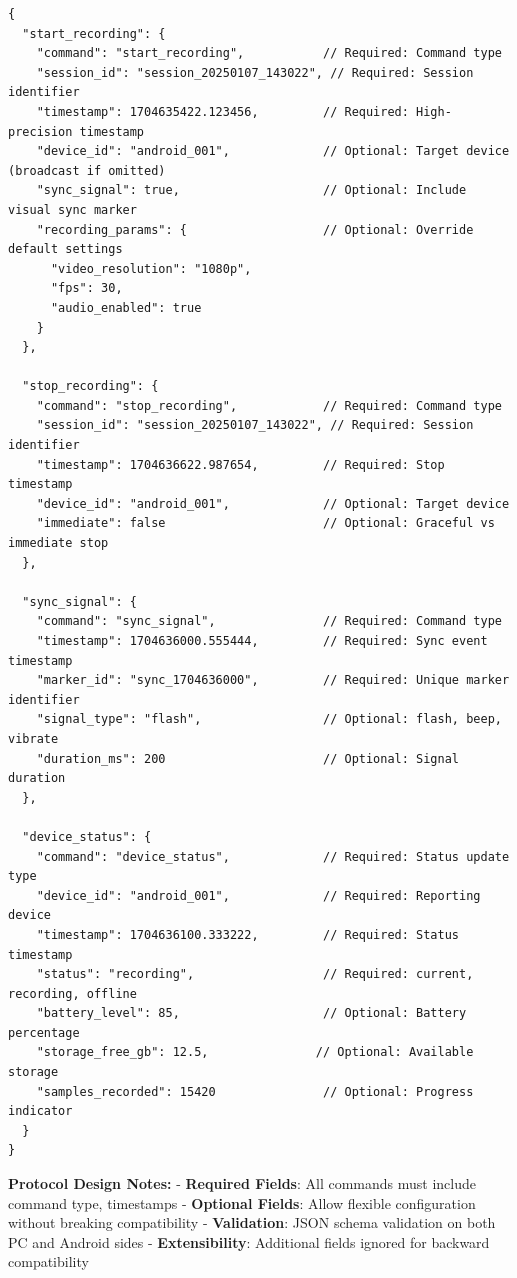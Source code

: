 \documentclass[12pt,a4paper]{article}
\begin{document}
\begin{lstlisting}
{
  "start_recording": {
    "command": "start_recording",           // Required: Command type
    "session_id": "session_20250107_143022", // Required: Session identifier  
    "timestamp": 1704635422.123456,         // Required: High-precision timestamp
    "device_id": "android_001",             // Optional: Target device (broadcast if omitted)
    "sync_signal": true,                    // Optional: Include visual sync marker
    "recording_params": {                   // Optional: Override default settings
      "video_resolution": "1080p",
      "fps": 30,
      "audio_enabled": true
    }
  },
  
  "stop_recording": {
    "command": "stop_recording",            // Required: Command type
    "session_id": "session_20250107_143022", // Required: Session identifier
    "timestamp": 1704636622.987654,         // Required: Stop timestamp
    "device_id": "android_001",             // Optional: Target device
    "immediate": false                      // Optional: Graceful vs immediate stop
  },
  
  "sync_signal": {
    "command": "sync_signal",               // Required: Command type
    "timestamp": 1704636000.555444,         // Required: Sync event timestamp
    "marker_id": "sync_1704636000",         // Required: Unique marker identifier
    "signal_type": "flash",                 // Optional: flash, beep, vibrate
    "duration_ms": 200                      // Optional: Signal duration
  },
  
  "device_status": {
    "command": "device_status",             // Required: Status update type
    "device_id": "android_001",             // Required: Reporting device
    "timestamp": 1704636100.333222,         // Required: Status timestamp
    "status": "recording",                  // Required: current, recording, offline
    "battery_level": 85,                    // Optional: Battery percentage
    "storage_free_gb": 12.5,               // Optional: Available storage
    "samples_recorded": 15420               // Optional: Progress indicator
  }
}
\end{lstlisting}

\textbf{Protocol Design Notes:} - \textbf{Required Fields}: All commands must include command type, timestamps - \textbf{Optional Fields}: Allow flexible configuration without breaking compatibility - \textbf{Validation}: JSON schema validation on both PC and Android sides - \textbf{Extensibility}: Additional fields ignored for backward compatibility
\end{document}
